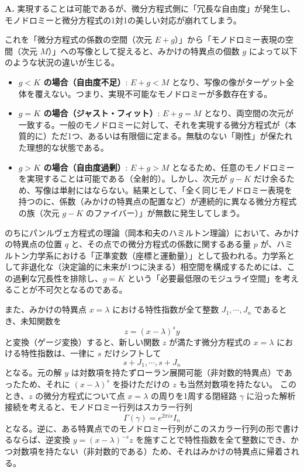 \begin{Q}
\textbf{A.} 実現することは可能であるが、微分方程式側に「冗長な自由度」が発生し、モノドロミーと微分方程式の1対1の美しい対応が崩れてしまう。

これを「微分方程式の係数の空間（次元 $E+g$）」から「モノドロミー表現の空間（次元 $M$）」への写像として捉えると、みかけの特異点の個数 $g$ によって以下のような状況の違いが生じる。

\begin{itemize}
    \item \textbf{$g < K$ の場合（自由度不足）}: 
    $E+g < M$ となり、写像の像がターゲット全体を覆えない。つまり、実現不可能なモノドロミーが多数存在する。
    
    \item \textbf{$g = K$ の場合（ジャスト・フィット）}:
    $E+g = M$ となり、両空間の次元が一致する。一般のモノドロミーに対して、それを実現する微分方程式が（本質的に）ただ1つ、あるいは有限個に定まる。無駄のない「剛性」が保たれた理想的な状態である。
    
    \item \textbf{$g > K$ の場合（自由度過剰）}:
    $E+g > M$ となるため、任意のモノドロミーを実現することは可能である（全射的）。しかし、次元が $g-K$ だけ余るため、写像は単射にはならない。結果として、「全く同じモノドロミー表現を持つのに、係数（みかけの特異点の配置など）が連続的に異なる微分方程式の族（次元 $g-K$ のファイバー）」が無数に発生してしまう。
\end{itemize}

のちにパンルヴェ方程式の理論（岡本和夫のハミルトン理論）において、みかけの特異点の位置 $q$ と、その点での微分方程式の係数に関するある量 $p$ が、ハミルトン力学系における「正準変数（座標と運動量）」として扱われる。力学系として非退化な（決定論的に未来が1つに決まる）相空間を構成するためには、この過剰な冗長性を排除し、$g=K$ という「必要最低限のモジュライ空間」を考えることが不可欠となるのである。
\end{Q}
また、みかけの特異点 $x=\lambda$ における特性指数が全て整数 $J_{1}, \cdots, J_{n}$ であるとき、未知関数を
\begin{equation}\label{eq:gauge_transform_local}
z = (x-\lambda)^{s} y
\end{equation}
と変換（ゲージ変換）すると、新しい関数 $z$ が満たす微分方程式の $x=\lambda$ における特性指数は、一律に $s$ だけシフトして
\[
s+J_{1}, \cdots, s+J_{n}
\]
となる。元の解 $y$ は対数項を持たずローラン展開可能（非対数的特異点）であったため、それに $(x-\lambda)^{s}$ を掛けただけの $z$ も当然対数項を持たない。
このとき、$z$ の微分方程式について点 $x=\lambda$ の周りを1周する閉経路 $\gamma$ に沿った解析接続を考えると、モノドロミー行列はスカラー行列
\[
\Gamma(\gamma) = e^{2\pi is} I_{n}
\]
となる。逆に、ある特異点でのモノドロミー行列がこのスカラー行列の形で書けるならば、逆変換 $y = (x-\lambda)^{-s} z$ を施すことで特性指数を全て整数にでき、かつ対数項を持たない（非対数的である）ため、それはみかけの特異点に帰着される。

